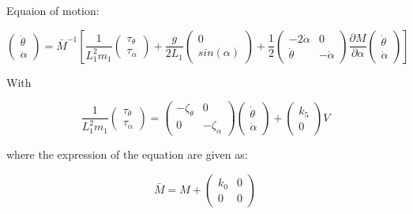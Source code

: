 
Equaion of motion:

\begin{equation}
\left( \begin{matrix}
        \ddot \theta \\
        \ddot \alpha
    \end{matrix} \right) = \bar M^{-1} \left[
\frac{1}{ L_1^2 m_1}
    \left( \begin{matrix}
        \tau_{\theta} \\
        \tau_{\alpha}
    \end{matrix} \right)
    +\frac{g}{2L_1}
    \left( \begin{matrix}
        0 \\
        sin( \alpha)
    \end{matrix} \right)
     + \frac{1}{2} \left( \begin{matrix}
    - 2 \dot \alpha & 0\\
        \dot \theta & -\dot \alpha
    \end{matrix} \right)
    \frac{\partial M}{\partial \alpha}
     \left( \begin{matrix}
        \dot \theta \\
        \dot \alpha
    \end{matrix} \right) \right]
\end{equation}

With

\begin{equation}
\frac{1}{ L_1^2 m_1}
    \left( \begin{matrix}
        \tau_{\theta} \\
        \tau_{\alpha}
    \end{matrix} \right)
    = \left( \begin{matrix}
        -\zeta_\theta & 0 \\ 0 & -\zeta_\alpha
    \end{matrix}\right)
    \left( \begin{matrix}
        \dot \theta \\ \dot \alpha
    \end{matrix}\right)
    +
    \left( \begin{matrix}
    k_5 \\ 0    
    \end{matrix}\right)
    V
\end{equation}

where the expression of the equation are given as:

\begin{equation}
    \bar M = M + 
    \left( \begin{matrix}
       k_0 & 0 \\ 0 & 0
    \end{matrix} \right)
\end{equation}

